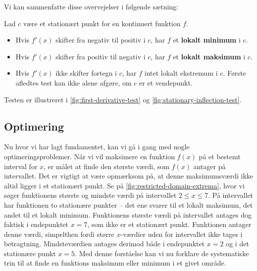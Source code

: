 Vi kan sammenfatte disse overvejelser i følgende sætning:

\begin{theorem}
    Lad \(c\) være et stationært punkt for en kontinuert funktion \(f\).
    \begin{itemize}
        \item Hvis \(f'(x)\) skifter fra negativ til positiv i \(c\), har \(f\) et \textbf{lokalt minimum} i \(c\).
        \item Hvis \(f'(x)\) skifter fra positiv til negativ i \(c\), har \(f\) et \textbf{lokalt maksimum} i \(c\).
        \item Hvis \(f'(x)\) ikke skifter fortegn i \(c\), har \(f\) intet lokalt ekstremum i \(c\). Første afledtes test kan ikke alene afgøre, om $c$ er et vendepunkt.
    \end{itemize}

    \end{theorem}
Testen er illustreret i \autoref{fig:first-derivative-test} og \autoref{fig:stationary-inflection-test}.


\subsection*{Optimering}
Nu hvor vi har lagt fundamentet, kan vi gå i gang med nogle optimeringsproblemer. Når vi vil maksimere en funktion $f(x)$ på et bestemt interval for $x$, er målet at finde den største værdi, som $f(x)$ antager på intervallet. Det er vigtigt at være opmærksom på, at denne maksimumsværdi ikke altid ligger i et stationært punkt. Se på \autoref{fig:restricted-domain-extrema}, hvor vi søger funktionens største og mindste værdi på intervallet $2 \leq x \leq 7$. På intervallet har funktionen to stationære punkter -- det ene svarer til et lokalt maksimum, det andet til et lokalt minimum. Funktionens største værdi på intervallet antages dog faktisk i endepunktet $x=7$, som ikke er et stationært punkt. Funktionen antager denne værdi, simpelthen fordi større $x$-værdier uden for intervallet ikke tages i betragtning. Mindsteværdien antages derimod både i endepunktet $x=2$ og i det stationære punkt $x=5$. Med denne forståelse kan vi nu forklare de systematiske trin til at finde en funktions maksimum eller minimum i et givet område.


